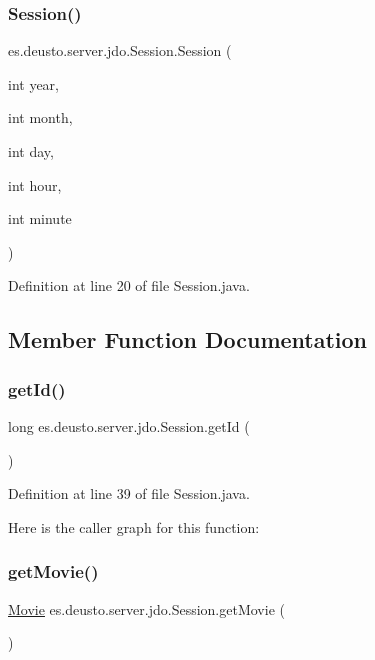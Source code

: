 \subsubsection{\texorpdfstring{Session()}{Session()}}
{\footnotesize\ttfamily es.\+deusto.\+server.\+jdo.\+Session.\+Session (\begin{DoxyParamCaption}\item[{int}]{year,  }\item[{int}]{month,  }\item[{int}]{day,  }\item[{int}]{hour,  }\item[{int}]{minute }\end{DoxyParamCaption})}



Definition at line 20 of file Session.\+java.



\subsection{Member Function Documentation}
\mbox{\label{classes_1_1deusto_1_1server_1_1jdo_1_1_session_ade2b7eec9ef10a4c733aa3f4b18a8fe3}} 
\subsubsection{\texorpdfstring{getId()}{getId()}}
{\footnotesize\ttfamily long es.\+deusto.\+server.\+jdo.\+Session.\+get\+Id (\begin{DoxyParamCaption}{ }\end{DoxyParamCaption})}



Definition at line 39 of file Session.\+java.

Here is the caller graph for this function\+:
\mbox{\label{classes_1_1deusto_1_1server_1_1jdo_1_1_session_afdae557964a51e2d6b037db206b344c1}} 
\subsubsection{\texorpdfstring{getMovie()}{getMovie()}}
{\footnotesize\ttfamily \mbox{\hyperlink{classes_1_1deusto_1_1server_1_1jdo_1_1_movie}{Movie}} es.\+deusto.\+server.\+jdo.\+Session.\+get\+Movie (\begin{DoxyParamCaption}{ }\end{DoxyParamCaption})}



